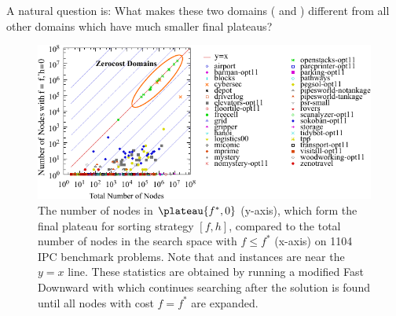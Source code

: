 A natural question is:  What makes these two domains
( and )  different from all other domains
which have much smaller final plateaus?

\begin{figure}[tbp]
   \centering
  \includegraphics[width=\linewidth]{tables/aaai16-frontier/aaai16prelim3/lmcut_frontier-front.pdf}
  \caption{
 The number of nodes in $\plateau{f^*, 0}$ (y-axis), which form
  the final plateau for sorting strategy $[f,h]$, compared to
  the total number of nodes in the search space with $f\leq f^*$
 (x-axis) on 1104 IPC benchmark problems.  Note that 
  and  instances are near the $y=x$ line.
  These statistics are obtained by running a modified Fast Downward with
 \lmcut which continues searching after the solution is found
 until all nodes with cost $f=f^*$ are expanded.} \label{fig:plateau}
\end{figure}

